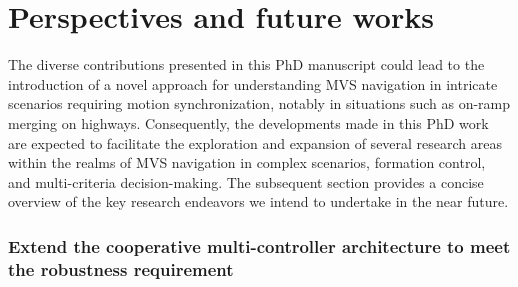 
































\section*{Perspectives and future works}






The diverse contributions presented in this PhD manuscript could lead to the introduction of a novel approach for understanding MVS navigation in intricate scenarios requiring motion synchronization, notably in situations such as on-ramp merging on highways. Consequently, the developments made in this PhD work are expected to facilitate the exploration and expansion of several research areas within the realms of MVS navigation in complex scenarios, formation control, and multi-criteria decision-making. The subsequent section provides a concise overview of the key research endeavors we intend to undertake in the near future. 






\subsubsection*{Extend the cooperative multi-controller architecture to meet the robustness requirement}


